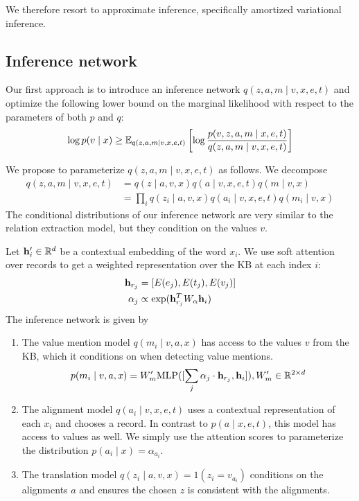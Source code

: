 \documentclass[12pt]{article}
\begin{document}
We therefore resort to approximate inference,
specifically amortized variational inference.

\subsection{Inference network}
Our first approach is to introduce an inference network $q(z,a,m\mid v,x,e,t)$
and optimize the following lower bound on the marginal likelihood
with respect to the parameters of both $p$ and $q$:
\begin{equation}
\label{eqn:lowerbound}
\log p(v\mid x) \geq
\mathbb{E}_{q(z,a,m\mid v,x,e,t)}\left[\log \frac{p(v,z,a,m\mid x,e,t)}{q(z,a,m\mid v,x,e,t)}\right]
\end{equation}

We propose to parameterize $q(z,a,m\mid v,x,e,t)$ as follows.
We decompose 
\begin{equation}
\begin{aligned}
q(z,a,m\mid v,x,e,t) &= q(z \mid a,v,x)q(a\mid v,x,e,t)q(m \mid v,x)\\
&= \prod_i q(z_i \mid a,v,x)q(a_i \mid v,x,e,t)q(m_i \mid v,x)
\end{aligned}
\end{equation}
The conditional distributions of our inference network
are very similar to the relation extraction model,
but they condition on the values $v$.

Let $\mathbf{h}'_i \in \mathbb{R}^d$ be a contextual embedding of the word $x_i$.
We use soft attention over records to get a weighted representation
over the KB at each index $i$:
\begin{align*}
\mathbf{h}_{r_j} &= [E(e_j), E(t_j), E(v_j)]\\
\alpha_j &\propto \exp(\mathbf{h}_{r_j}^T W_\alpha \mathbf{h}_i)
\end{align*}
The inference network is given by
\begin{enumerate}
\item The value mention model $q(m_i \mid v,a,x)$ 
    has access to the values $v$ from the KB, which it conditions on
    when detecting value mentions. 
    $$p(m_i \mid v,a,x) = W_m' \textrm{MLP}([\sum_j \alpha_j \cdot \mathbf{h}_{r_j}, \mathbf{h}_i]), W'_m \in \mathbb{R}^{2 \times d}$$
\item The alignment model $q(a_i \mid v,x,e,t)$
    uses a contextual representation of each $x_i$ and chooses a record.
    In contrast to $p(a\mid x,e,t)$, this model has access to values as well.
    We simply use the attention scores to parameterize the distribution
    $p(a_i \mid x) = \alpha_{a_i}$.
\item The translation model $q(z_i \mid a,v,x) = 1(z_i = v_{a_i})$
    conditions on the alignments $a$ and ensures the chosen $z$ is consistent
    with the alignments. 
\end{enumerate}
\end{document}
